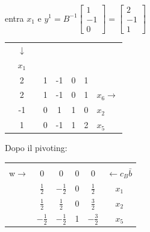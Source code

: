 entra $x_{1}$ e $y^{1}=B^{-1}\begin{bmatrix}1\\-1\\0\end{bmatrix}=\begin{bmatrix}2\\-1\\1\end{bmatrix}$
\begin{table}[!h]
	\centering
	\def\arraystretch{1.35}
	\begin{tabular}{r|c|c|ccc|c|l}
		\multicolumn{1}{c}{} & \multicolumn{1}{c}{$\downarrow$} & \multicolumn{1}{c}{} &  &  & \multicolumn{1}{c}{} & \multicolumn{1}{c}{} & \\
		\multicolumn{1}{c}{} & \multicolumn{1}{c}{$x_{1}$} & \multicolumn{1}{c}{} &  &  & \multicolumn{1}{c}{} & \multicolumn{1}{c}{} & \\ \cline{2-2} \cline{4-7}
		& 2 &  & 1 & -1 & 0 & 1 &  \\ \cline{2-2} \cline{4-7}
		& {\LARGE \textcircled{\normalsize $2$}} &  & 1 & -1 & 0 & 1 & $x_{6}\rightarrow$ \\
		& -1 &  & 0 & 1 & 1 & 0 & $x_{2}$ \\
		& 1 &  & 0 & -1 & 1 & 2 & $x_{5}$ \\
		\cline{2-2} \cline{4-7}
	\end{tabular}
\end{table}
\clearpage
Dopo il pivoting:
\begin{table}[!h]
	\def\arraystretch{2.1}
	\centering
	\begin{tabular}{c|ccc|c|c}
		\multicolumn{1}{c}{} & \multicolumn{1}{c}{} & & \multicolumn{1}{c}{} & \multicolumn{1}{c}{} & \\ \cline{2-5}
		w$\rightarrow$ & 0 & 0 & 0 & 0 & $\leftarrow c_{B}\bar{b}$ \\ \cline{2-5}
		& $\frac{1}{2}$ & $-\frac{1}{2}$ & 0 & $\frac{1}{2}$ & $x_{1}$ \\
		& $\frac{1}{2}$ & $\frac{1}{2}$ & 0 & $\frac{3}{2}$ & $x_{2}$ \\
		& $-\frac{1}{2}$ & $-\frac{1}{2}$ & 1 & $-\frac{3}{2}$ & $x_{5}$ \\ \cline{2-5}
	\end{tabular}
\end{table}

